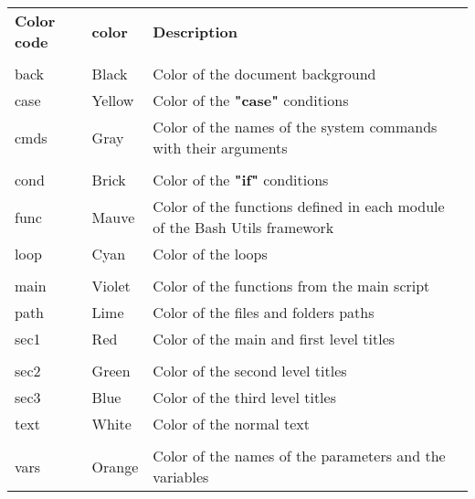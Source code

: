 \documentclass[a4paper,10pt]{article}
\begin{document}
\begin{justify}
    \begin{tabular}{lll}
        \textbf{Color code} & \textbf{color}        & \textbf{Description}\\\\

        \color{text}back    & \color{text}Black     & \color{text}Color of the document background\\
        \color{case}case    & \color{case}Yellow    & \color{case}Color of the \textbf{"case"} conditions\\
        \color{cmds}cmds    & \color{cmds}Gray      & \color{cmds}Color of the names of the system commands with their arguments\\\\

        \color{cond}cond    & \color{cond}Brick     & \color{cond}Color of the \textbf{"if"} conditions\\
        \color{func}func    & \color{func}Mauve     & \color{func}Color of the functions defined in each module of the Bash Utils framework\\
        \color{loop}loop    & \color{loop}Cyan      & \color{loop}Color of the loops\\\\

        \color{main}main    & \color{main}Violet    & \color{main}Color of the functions from the main script\\
        \color{path}path    & \color{path}Lime      & \color{path}Color of the files and folders paths\\
        \color{sec1}sec1    & \color{sec1}Red       & \color{sec1}Color of the main and first level titles\\\\

        \color{sec2}sec2    & \color{sec2}Green     & \color{sec2}Color of the second level titles\\
        \color{sec3}sec3    & \color{sec3}Blue      & \color{sec3}Color of the third level titles\\
        \color{text}text    & \color{text}White     & \color{text}Color of the normal text\\\\

        \color{vars}vars    & \color{vars}Orange    & \color{vars}Color of the names of the parameters and the variables\\
    \end{tabular}
\end{justify}
\end{document}
